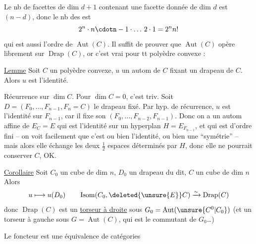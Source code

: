 Le nb de facettes de dim $d+1$ contenant une facette donnée de dim $d$ est  $(n-d)$, donc le nb des   est
\[
2^n\cdot n\cdotn-1\cdot\ldots\,2\cdot1=2^n n!
\]
qui est aussi l'ordre de $\operatorname{Aut}(C)$. Il suffit de prouver que $\operatorname{Aut}(C)$ opère librement sur $\operatorname{Drap}(C)$, or c'est vrai pour tt polyèdre convexe :

\uline{Lemme} Soit $C$ un polyèdre convexe, $u$ un autom de $C$ fixant un drapeau de $C$. Alors $u$ est l'identité.

Récurrence sur $\dim C$. Pour $\dim C=0$, c'est triv. Soit $D=(F_0,\ldots,F_{n-1},F_n=C)$ le drapeau fixé. Par hyp. de récurrence, $u$ est l'identité sur $F_{n-1}$, car il fixe son   $(F_0,\ldots,F_{n-2},F_{n-1})$. Donc on a un autom  affine de $E_C=E$ qui est l'identité sur un hyperplan $H=E_{F_{n-1}}$, et qui est d'ordre fini -- on voit facilement que c'est ou bien l'identité, ou bien une ``symétrie'' -- mais alors elle échange les deux $\frac12$ espaces déterminés par $H$, donc elle ne pourrait conserver $C$, OK.


\uline{Corollaire} Soit $C_0$ un cube de dim $n$, $D_0$ un drapeau du dit,  $C$ un cube de dim $n$ Alors
\[
u\longmapsto u(D_0)\qquad\operatorname{Isom}(C_0,\deleted{\unsure{E}}C)\xrightarrow{\sim}\operatorname{Drap}(C)
\]
donc $\operatorname{Drap}(C)$ est un \uline{torseur à droite} sous $G_0=\operatorname{Aut}(\unsure{C^{0}|C_0})$ (et un torseur à gauche sous $G=\operatorname{Aut}(C)$, qui est le commutant de $G_0$\ldots)

Le foncteur
est une équivalence de catégories

